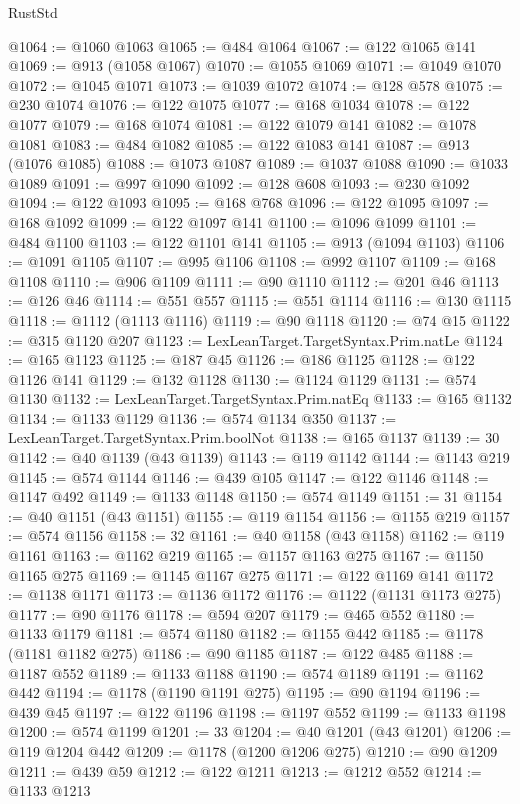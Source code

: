 \begin{lexlean}{RustStd}
\begin{coremodule}
@1064 := @1060 @1063
@1065 := @484 @1064
@1067 := @122 @1065 @141
@1069 := @913 (@1058 @1067)
@1070 := @1055 @1069
@1071 := @1049 @1070
@1072 := @1045 @1071
@1073 := @1039 @1072
@1074 := @128 @578
@1075 := @230 @1074
@1076 := @122 @1075
@1077 := @168 @1034
@1078 := @122 @1077
@1079 := @168 @1074
@1081 := @122 @1079 @141
@1082 := @1078 @1081
@1083 := @484 @1082
@1085 := @122 @1083 @141
@1087 := @913 (@1076 @1085)
@1088 := @1073 @1087
@1089 := @1037 @1088
@1090 := @1033 @1089
@1091 := @997 @1090
@1092 := @128 @608
@1093 := @230 @1092
@1094 := @122 @1093
@1095 := @168 @768
@1096 := @122 @1095
@1097 := @168 @1092
@1099 := @122 @1097 @141
@1100 := @1096 @1099
@1101 := @484 @1100
@1103 := @122 @1101 @141
@1105 := @913 (@1094 @1103)
@1106 := @1091 @1105
@1107 := @995 @1106
@1108 := @992 @1107
@1109 := @168 @1108
@1110 := @906 @1109
@1111 := @90 @1110
@1112 := @201 @46
@1113 := @126 @46
@1114 := @551 @557
@1115 := @551 @1114
@1116 := @130 @1115
@1118 := @1112 (@1113 @1116)
@1119 := @90 @1118
@1120 := @74 @15
@1122 := @315 @1120 @207
@1123 := LexLeanTarget.TargetSyntax.Prim.natLe
@1124 := @165 @1123
@1125 := @187 @45
@1126 := @186 @1125
@1128 := @122 @1126 @141
@1129 := @132 @1128
@1130 := @1124 @1129
@1131 := @574 @1130
@1132 := LexLeanTarget.TargetSyntax.Prim.natEq
@1133 := @165 @1132
@1134 := @1133 @1129
@1136 := @574 @1134 @350
@1137 := LexLeanTarget.TargetSyntax.Prim.boolNot
@1138 := @165 @1137
@1139 := 30
@1142 := @40 @1139 (@43 @1139)
@1143 := @119 @1142
@1144 := @1143 @219
@1145 := @574 @1144
@1146 := @439 @105
@1147 := @122 @1146
@1148 := @1147 @492
@1149 := @1133 @1148
@1150 := @574 @1149
@1151 := 31
@1154 := @40 @1151 (@43 @1151)
@1155 := @119 @1154
@1156 := @1155 @219
@1157 := @574 @1156
@1158 := 32
@1161 := @40 @1158 (@43 @1158)
@1162 := @119 @1161
@1163 := @1162 @219
@1165 := @1157 @1163 @275
@1167 := @1150 @1165 @275
@1169 := @1145 @1167 @275
@1171 := @122 @1169 @141
@1172 := @1138 @1171
@1173 := @1136 @1172
@1176 := @1122 (@1131 @1173 @275)
@1177 := @90 @1176
@1178 := @594 @207
@1179 := @465 @552
@1180 := @1133 @1179
@1181 := @574 @1180
@1182 := @1155 @442
@1185 := @1178 (@1181 @1182 @275)
@1186 := @90 @1185
@1187 := @122 @485
@1188 := @1187 @552
@1189 := @1133 @1188
@1190 := @574 @1189
@1191 := @1162 @442
@1194 := @1178 (@1190 @1191 @275)
@1195 := @90 @1194
@1196 := @439 @45
@1197 := @122 @1196
@1198 := @1197 @552
@1199 := @1133 @1198
@1200 := @574 @1199
@1201 := 33
@1204 := @40 @1201 (@43 @1201)
@1206 := @119 @1204 @442
@1209 := @1178 (@1200 @1206 @275)
@1210 := @90 @1209
@1211 := @439 @59
@1212 := @122 @1211
@1213 := @1212 @552
@1214 := @1133 @1213

\end{coremodule}
\end{lexlean}
